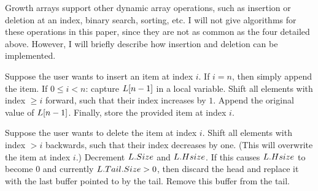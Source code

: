 Growth arrays support other dynamic array operations, such as insertion or deletion at an index, binary search, sorting, etc. I will not give algorithms for these operations in this paper, since they are not as common as the four detailed above. However, I will briefly describe how insertion and deletion can be implemented.

Suppose the user wants to insert an item at index $i$. If $i = n$, then simply append the item. If $0 \leq i < n$: capture $L[n - 1]$ in a local variable. Shift all elements with index $\geq i$ forward, such that their index increases by $1$. Append the original value of $L[n - 1]$. Finally, store the provided item at index $i$.

Suppose the user wants to delete the item at index $i$. Shift all elements with index $> i$ backwards, such that their index decreases by one. (This will overwrite the item at index $i$.) Decrement $L.Size$ and $L.Hsize$. If this causes $L.Hsize$ to become $0$ and currently $L.Tail.Size > 0$, then discard the head and replace it with the last buffer pointed to by the tail. Remove this buffer from the tail.